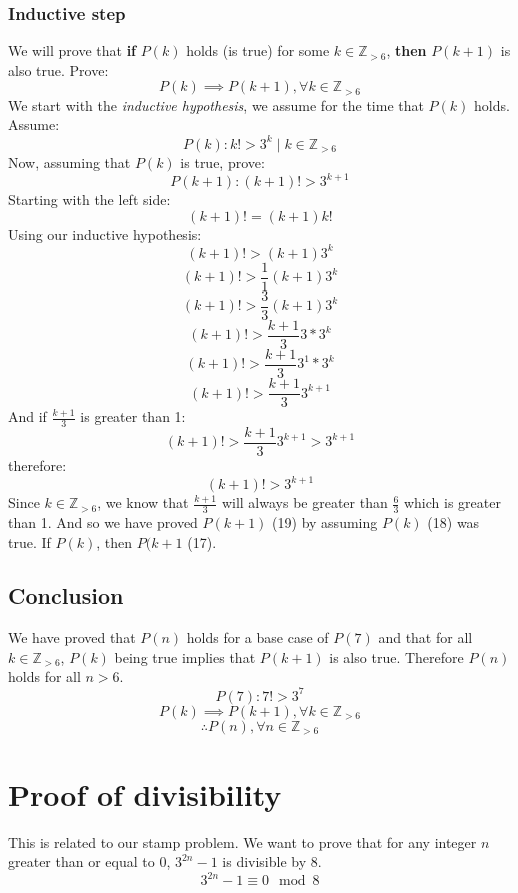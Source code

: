\documentclass{article}
\begin{document}
\subsubsection{Inductive step}
We will prove that \textbf{if} $P(k)$ holds (is true) for some $k \in \mathbb Z_{> 6}$, \textbf{then} $P(k + 1)$ is also true. Prove:
\begin{equation}
P(k) \implies P(k + 1), \forall k \in \mathbb Z_{> 6}
\end{equation}
We start with the \textit{inductive hypothesis}, we assume for the time that $P(k)$ holds. Assume:
\begin{equation}
P(k): k! > 3^k \mid k \in \mathbb Z_{> 6}
\end{equation}
Now, assuming that $P(k)$ is true, prove:
\begin{equation}
P(k + 1): (k + 1)! > 3^{k + 1}
\end{equation}
Starting with the left side:
\[ (k + 1)! = (k + 1) k! \]
Using our inductive hypothesis:
\[ (k + 1)! > (k + 1) 3^k \]
\[ (k + 1)! > \frac{1}{1} (k + 1) 3^k \]
\[ (k + 1)! > \frac{3}{3} (k + 1) 3^k \]
\[ (k + 1)! > \frac{k + 1}{3} 3 * 3^k \]
\[ (k + 1)! > \frac{k + 1}{3} 3^1 * 3^k \]
\[ (k + 1)! > \frac{k + 1}{3} 3^{k + 1} \]
And if $\frac{k + 1}{3}$ is greater than 1:
\[ (k + 1)! > \frac{k + 1}{3} 3^{k + 1} > 3^{k + 1} \]
therefore:
\[ (k + 1)! > 3^{k + 1} \]
Since $k \in \mathbb Z_{> 6}$, we know that $\frac{k + 1}{3}$ will always be greater than $\frac{6}{3}$ which is greater than 1.
And so we have proved $P(k + 1)$ (19) by assuming $P(k)$ (18) was true. If $P(k)$, then $P(k + 1$ (17).

\subsection{Conclusion}
We have proved that $P(n)$ holds for a base case of $P(7)$ and that for all $k \in \mathbb Z_{> 6}$, $P(k)$ being true implies that $P(k + 1)$ is also true. Therefore $P(n)$ holds for all $n > 6$.
\[P(7): 7! > 3^7 \]
\[P(k) \implies P(k + 1), \forall k \in  \mathbb Z_{> 6}\]
\[ \therefore P(n), \forall n \in \mathbb Z_{> 6} \]



\section{Proof of divisibility}
This is related to our stamp problem. We want to prove that for any integer $n$ greater than or equal to 0, $3^{2n} - 1$ is divisible by 8.
\[ 3^{2n} - 1 \equiv 0 \mod 8 \]
\end{document}
